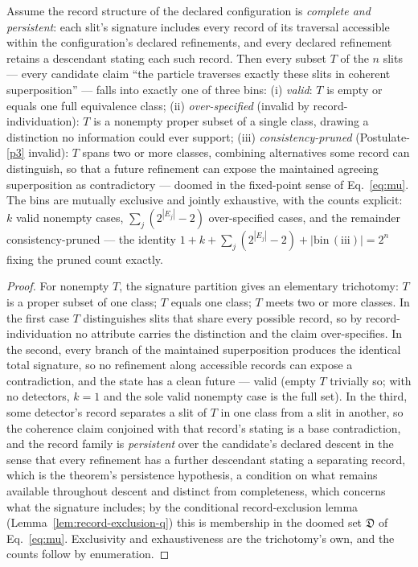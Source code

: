 \begin{theorem}\label{thm:powerset} Assume the record structure of the declared configuration is \emph{complete and persistent}: each slit's signature includes every record of its traversal accessible within the configuration's declared refinements, and every declared refinement retains a descendant stating each such record. Then every subset $T$ of the $n$ slits --- every candidate claim ``the particle traverses exactly these slits in coherent superposition'' --- falls into exactly one of three bins: (i) \emph{valid}: $T$ is empty or equals one full equivalence class; (ii) \emph{over-specified} (invalid by record-individuation): $T$ is a nonempty proper subset of a single class, drawing a distinction no information could ever support; (iii) \emph{consistency-pruned} (Postulate-\ref{p3} invalid): $T$ spans two or more classes, combining alternatives some record can distinguish, so that a future refinement can expose the maintained agreeing superposition as contradictory --- doomed in the fixed-point sense of Eq.~\eqref{eq:mu}. The bins are mutually exclusive and jointly exhaustive, with the counts explicit: $k$ valid nonempty cases, $\sum_j (2^{|E_j|} - 2)$ over-specified cases, and the remainder consistency-pruned --- the identity $1 + k + \sum_j (2^{|E_j|} - 2) + |\mathrm{bin\,(iii)}| = 2^{n}$ fixing the pruned count exactly.
\end{theorem}

\begin{proof}
For nonempty $T$, the signature partition gives an elementary trichotomy: $T$ is a proper subset of one class; $T$ equals one class; $T$ meets two or more classes. In the first case $T$ distinguishes slits that share every possible record, so by record-individuation no attribute carries the distinction and the claim over-specifies. In the second, every branch of the maintained superposition produces the identical total signature, so no refinement along accessible records can expose a contradiction, and the state has a clean future --- valid (empty $T$ trivially so; with no detectors, $k = 1$ and the sole valid nonempty case is the full set). In the third, some detector's record separates a slit of $T$ in one class from a slit in another, so the coherence claim conjoined with that record's stating is a base contradiction, and the record family is \emph{persistent} over the candidate's declared descent in the sense that every refinement has a further descendant stating a separating record, which is the theorem's persistence hypothesis, a condition on what remains available throughout descent and distinct from completeness, which concerns what the signature includes; by the conditional record-exclusion lemma (Lemma~\ref{lem:record-exclusion-q}) this is membership in the doomed set $\mathfrak{D}$ of Eq.~\eqref{eq:mu}. Exclusivity and exhaustiveness are the trichotomy's own, and the counts follow by enumeration.
\end{proof}

